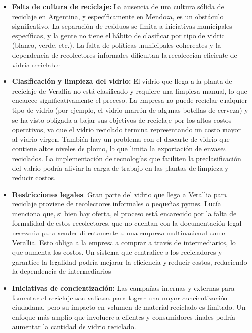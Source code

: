 \begin{itemize}
		\item \textbf{Falta de cultura de reciclaje:} La ausencia de una cultura sólida de reciclaje en Argentina, y específicamente en Mendoza, es un obstáculo significativo. La separación de residuos se limita a iniciativas municipales específicas, y la gente no tiene el hábito de clasificar por tipo de vidrio (blanco, verde, etc.). La falta de políticas municipales coherentes y la dependencia de recolectores informales dificultan la recolección eficiente de vidrio reciclable.

		\item \textbf{Clasificación y limpieza del vidrio:} El vidrio que llega a la planta de reciclaje de Verallia no está clasificado y requiere una limpieza manual, lo que encarece significativamente el proceso. La empresa no puede reciclar cualquier tipo de vidrio (por ejemplo, el vidrio marrón de algunas botellas de cerveza) y se ha visto obligada a bajar sus objetivos de reciclaje por los altos costos operativos, ya que el vidrio reciclado termina representando un costo mayor al vidrio virgen. También hay un problema con el descarte de vidrio que contiene altos niveles de plomo, lo que limita la exportación de envases reciclados. La implementación de tecnologías que faciliten la preclasificación del vidrio podría aliviar la carga de trabajo en las plantas de limpieza y reducir costos.

		\item \textbf{Restricciones legales:} Gran parte del vidrio que llega a Verallia para reciclaje proviene de recolectores informales o pequeñas pymes. Lucía menciona que, si bien hay oferta, el proceso está encarecido por la falta de formalidad de estos recolectores, que no cuentan con la documentación legal necesaria para vender directamente a una empresa multinacional como Verallia. Esto obliga a la empresa a comprar a través de intermediarios, lo que aumenta los costos. Un sistema que centralice a los recicladores y garantice la legalidad podría mejorar la eficiencia y reducir costos, reduciendo la dependencia de intermediarios.

		\item \textbf{Iniciativas de concientización:} Las campañas internas y externas para fomentar el reciclaje son valiosas para lograr una mayor concientización ciudadana, pero su impacto en volumen de material reciclado es limitado. Un enfoque más amplio que involucre a clientes y consumidores finales podría aumentar la cantidad de vidrio reciclado.
		

\end{itemize}
